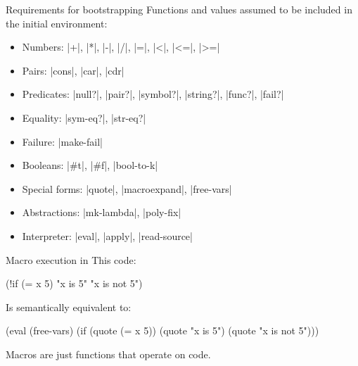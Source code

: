 \begin{frame}[fragile]{Requirements for bootstrapping}
Functions and values assumed to be included in the initial environment:
\begin{itemize}
\item Numbers: \linline|+|, \linline|*|, \linline|-|, \linline|/|, \linline|=|, \linline|<|, \linline|<=|, \linline|>=|
\item Pairs: \linline|cons|, \linline|car|, \linline|cdr|
\item Predicates: \linline|null?|, \linline|pair?|, \linline|symbol?|, \linline|string?|, \linline|func?|, \linline|fail?|
\item Equality: \linline|sym-eq?|, \linline|str-eq?|
\item Failure: \linline|make-fail|
\item Booleans: \tinline|#t|, \tinline|#f|, \linline|bool-to-k|
\item Special forms: \linline|quote|, \linline|macroexpand|, \linline|free-vars|
\item Abstractions: \linline|mk-lambda|, \linline|poly-fix|
\item Interpreter: \linline|eval|, \linline|apply|, \linline|read-source|
\end{itemize}
\end{frame}

\begin{frame}[fragile]{Macro execution in \lang}
This code:
\begin{listingbox}\begin{ildcode}
(!if (= x 5)
  "x is 5"
  "x is not 5")
\end{ildcode}\end{listingbox}
Is semantically equivalent to:
\begin{listingbox}\begin{ildcode}
(eval (free-vars) (if (quote (= x 5))
  (quote "x is 5")
  (quote "x is not 5")))
\end{ildcode}\end{listingbox}
Macros are just functions that operate on code.
\end{frame}

